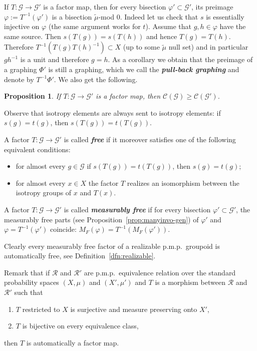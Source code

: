 \documentclass[10pt]{amsart}
\newtheorem{prop}[cdrthm]{Proposition}
\theoremstyle{definition}
\newcommand{\defin}[1]{\textbf{\emph{#1}}}
\newcommand{\RR}{\mathcal{R}}
\newcommand{\cost}{\mathcal{C}}
\newcommand{\cg}{\mathcal{G}}
\newcommand{\ph}{\varphi}
\newcommand{\pmp}{p.m.p.\ }
\newcommand*{\alphenumi}{\renewcommand*{\theenumi}{\alph{enumi}}}
\begin{document}
If $T:\cg\rightarrow \cg'$ is a factor map, then for every bisection $\ph'\subset \cg'$, its preimage $\ph:=T^{-1}(\ph')$ is a bisection $\widetilde{\mu}$-mod $0$. Indeed let us check that $s$ is essentially injective on $\ph$ (the same argument works for $t$). Assume that $g,h\in \ph$ have the same source. Then $s(T(g))=s(T(h))$ and hence $T(g)=T(h)$. Therefore $T^{-1}(T(g)T(h)^{-1})\subset X$ (up to some $\widetilde{\mu}$ null set) and in particular $gh^{-1}$ is a unit and therefore $g=h$. As a corollary we obtain that the preimage of a graphing $\Phi'$ is still a graphing, which we call the
\defin{pull-back graphing} and denote by $T^{-1} \Phi'$. We also get the following.

\begin{prop}
If $T:\cg\rightarrow \cg'$ is a factor map, then $\cost(\cg)\geq\cost(\cg')$.
\end{prop}

Observe that isotropy elements are always sent to isotropy elements: if $s(g)=t(g)$, then $s(T(g))=t(T(g))$.

A factor $T:\cg\rightarrow\cg'$ is called
\defin{free} if it moreover satisfies one of the following equivalent conditions:
\begin{itemize}
\item for almost every $g\in\cg$ if $s(T(g))=t(T(g))$, then $s(g)=t(g)$;
\item for almost every $x\in X$ the factor $T$ realizes an isomorphism between the isotropy groups of $x$ and $T(x)$.
\end{itemize}

A factor $T:\cg\rightarrow\cg'$ is called
\defin{measurably free} if for every bisection $\ph'\subset \cg'$, the measurably free parts (see Proposition~\ref{prop:manyinvo-gen}) of $\ph'$ and $\ph=T^{-1}(\ph')$ coincide: $M_F(\ph)=T^{-1}(M_F(\ph'))$.

Clearly every measurably free factor of a realizable \pmp groupoid is automatically free, see Definition~\ref{dfn:realizable}.

Remark that if $\RR$ and $\RR'$ are \pmp equivalence relation over the standard probability spaces $(X,\mu)$ and $(X',\mu')$ and $T$ is a morphism between $\RR$ and $\RR'$ such that
\begin{enumerate}\alphenumi
\item $T$ restricted to $X$ is surjective and measure preserving onto $X'$,
\item $T$ is bijective on every equivalence class,
\end{enumerate}
then $T$ is automatically a factor map.
\end{document}
